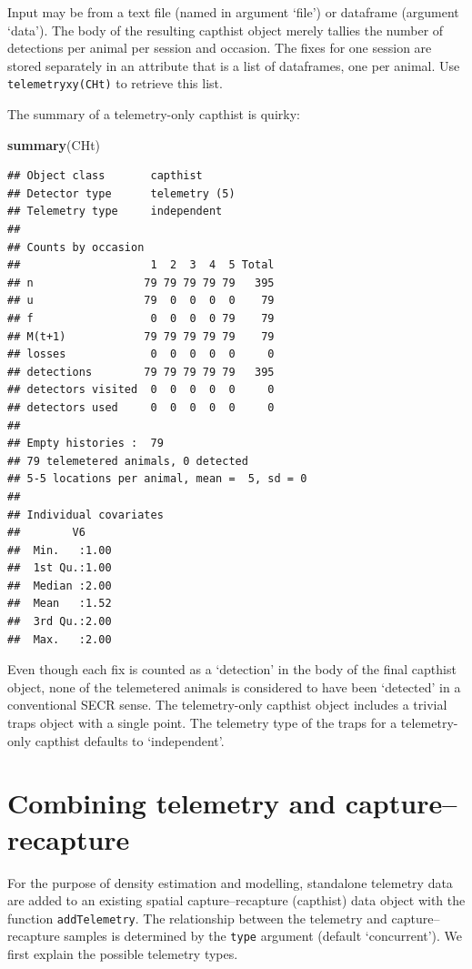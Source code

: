 \documentclass[
]{book}
\newenvironment{Shaded}{\begin{snugshade}}{\end{snugshade}}
\newcommand{\FunctionTok}[1]{\textcolor[rgb]{0.13,0.29,0.53}{\textbf{#1}}}
\newcommand{\NormalTok}[1]{#1}
\begin{document}
Input may be from a text file (named in argument `file') or dataframe (argument `data').
The body of the resulting capthist object merely tallies the number of detections per animal per session and occasion. The fixes for one session are stored separately in an attribute that is a list of dataframes, one per animal. Use \texttt{telemetryxy(CHt)} to retrieve this list.

The summary of a telemetry-only capthist is quirky:

\begin{Shaded}
\begin{Highlighting}[]
\FunctionTok{summary}\NormalTok{(CHt)}
\end{Highlighting}
\end{Shaded}

\begin{verbatim}
## Object class       capthist 
## Detector type      telemetry (5) 
## Telemetry type     independent 
## 
## Counts by occasion 
##                    1  2  3  4  5 Total
## n                 79 79 79 79 79   395
## u                 79  0  0  0  0    79
## f                  0  0  0  0 79    79
## M(t+1)            79 79 79 79 79    79
## losses             0  0  0  0  0     0
## detections        79 79 79 79 79   395
## detectors visited  0  0  0  0  0     0
## detectors used     0  0  0  0  0     0
## 
## Empty histories :  79 
## 79 telemetered animals, 0 detected
## 5-5 locations per animal, mean =  5, sd = 0 
## 
## Individual covariates
##        V6      
##  Min.   :1.00  
##  1st Qu.:1.00  
##  Median :2.00  
##  Mean   :1.52  
##  3rd Qu.:2.00  
##  Max.   :2.00
\end{verbatim}

Even though each fix is counted as a `detection' in the body of the final capthist object, none of the telemetered animals is considered to have been `detected' in a conventional SECR sense. The telemetry-only capthist object includes a trivial traps object with a single point. The telemetry type of the traps for a telemetry-only capthist defaults to `independent'.

\section{Combining telemetry and capture--recapture}\label{composite}

For the purpose of density estimation and modelling, standalone telemetry data are added to an existing spatial capture--recapture (capthist) data object with the function \texttt{addTelemetry}. The relationship between the telemetry and capture--recapture samples is determined by the \texttt{type} argument (default `concurrent'). We first explain the possible telemetry types.
\end{document}
